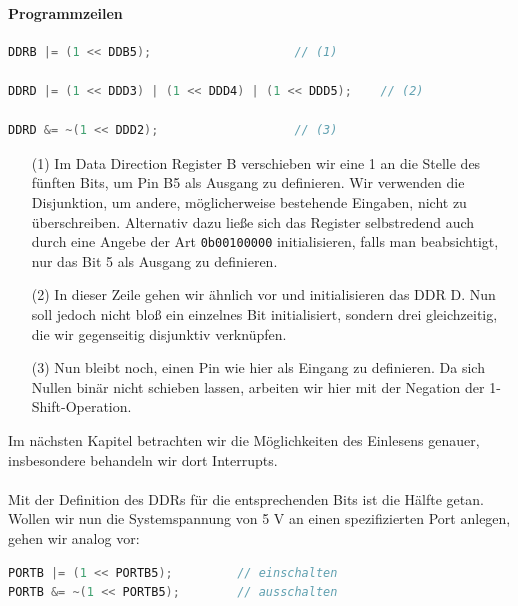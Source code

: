 \documentclass[11pt,a4paper]{scrartcl}
\begin{document}
\paragraph{Programmzeilen} \quad
\begin{lstlisting}[language=C]
DDRB |= (1 << DDB5);					// (1)

DDRD |= (1 << DDD3) | (1 << DDD4) | (1 << DDD5);	// (2)

DDRD &= ~(1 << DDD2);					// (3)
\end{lstlisting}
\begin{itemize}
\item[(1)] Im Data Direction Register B verschieben wir eine 1 an die Stelle des fünften Bits, um Pin B5 als Ausgang zu definieren. Wir verwenden die Disjunktion, um andere, möglicherweise bestehende Eingaben, nicht zu überschreiben. Alternativ dazu ließe sich das Register selbstredend auch durch eine Angebe der Art \texttt{0b00100000} initialisieren, falls man beabsichtigt, nur das Bit 5 als Ausgang zu definieren.
\item[(2)] In dieser Zeile gehen wir ähnlich vor und initialisieren das DDR D. Nun soll jedoch nicht bloß ein einzelnes Bit initialisiert, sondern drei gleichzeitig, die wir gegenseitig disjunktiv verknüpfen.
\item[(3)] Nun bleibt noch, einen Pin wie hier als Eingang zu definieren. Da sich Nullen binär nicht schieben lassen, arbeiten wir hier mit der Negation der 1-Shift-Operation.
\end{itemize}
Im nächsten Kapitel betrachten wir die Möglichkeiten des Einlesens genauer, insbesondere behandeln wir dort Interrupts. \\\\
Mit der Definition des DDRs für die entsprechenden Bits ist die Hälfte getan. Wollen wir nun die Systemspannung von 5 V an einen spezifizierten Port anlegen, gehen wir analog vor:
\begin{lstlisting}[language=C]
PORTB |= (1 << PORTB5);			// einschalten
PORTB &= ~(1 << PORTB5);		// ausschalten
\end{lstlisting}
\end{document}
